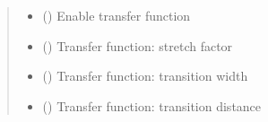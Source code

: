 \documentclass[letterpaper,10pt,english]{sphinxmanual}
\begin{document}
\begin{fulllineitems}
\begin{quote}
\begin{description}
\begin{itemize}
\item {} 
 () \textendash{} Enable transfer function

\item {} 
 () \textendash{} Transfer function: stretch factor

\item {} 
 () \textendash{} Transfer function: transition width

\item {} 
 () \textendash{} Transfer function: transition distance

\end{itemize}

\end{description}\end{quote}

\end{fulllineitems}

\end{document}
